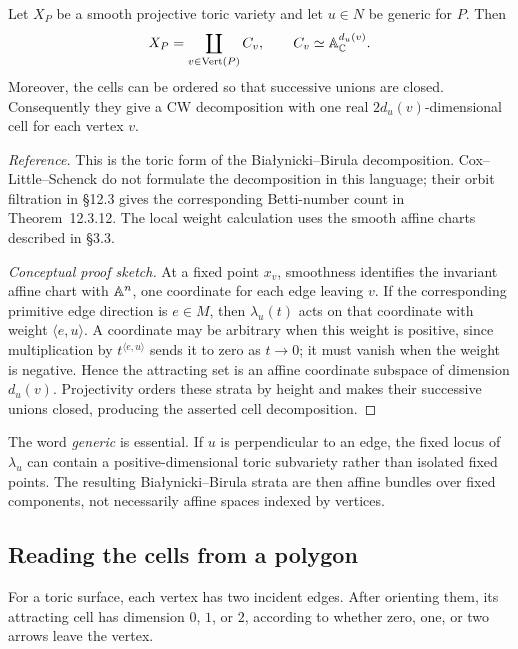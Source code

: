 \begin{theorem}
\label{thm:toric-attracting-cells}
Let \(X_P\) be a smooth projective toric variety and let \(u\in N\) be
generic for \(P\). Then
\[
X_P=\coprod_{v\in\operatorname{Vert}(P)}C_v,
\qquad
C_v\simeq\mathbb{A}^{d_u(v)}_{\mathbb{C}}.
\]
Moreover, the cells can be ordered so that successive unions are
closed. Consequently they give a CW decomposition with one real
\(2d_u(v)\)-dimensional cell for each vertex \(v\).
\end{theorem}

\noindent
\textit{Reference.}
This is the toric form of the Bia\l ynicki--Birula decomposition.
Cox--Little--Schenck do not formulate the decomposition in this
language; their orbit filtration in \S12.3 gives the corresponding
Betti-number count in Theorem~12.3.12. The local weight calculation
uses the smooth affine charts described in \S3.3.

\begin{proof}[Conceptual proof sketch]
At a fixed point \(x_v\), smoothness identifies the invariant affine
chart with \(\mathbb{A}^n\), one coordinate for each edge leaving \(v\). If
the corresponding primitive edge direction is \(e\in M\), then
\(\lambda_u(t)\) acts on that coordinate with weight
\(\langle e,u\rangle\). A coordinate may be arbitrary when this weight
is positive, since multiplication by \(t^{\langle e,u\rangle}\) sends
it to zero as \(t\to0\); it must vanish when the weight is negative.
Hence the attracting set is an affine coordinate subspace of dimension
\(d_u(v)\). Projectivity orders these strata by height and makes their
successive unions closed, producing the asserted cell decomposition.
\end{proof}

\begin{warningbox}
The word \emph{generic} is essential. If \(u\) is perpendicular to an
edge, the fixed locus of \(\lambda_u\) can contain a positive-dimensional
toric subvariety rather than isolated fixed points. The resulting
Bia\l ynicki--Birula strata are then affine bundles over fixed components,
not necessarily affine spaces indexed by vertices.
\end{warningbox}

\subsection{Reading the cells from a polygon}

For a toric surface, each vertex has two incident edges. After orienting
them, its attracting cell has dimension \(0\), \(1\), or \(2\), according
to whether zero, one, or two arrows leave the vertex.

